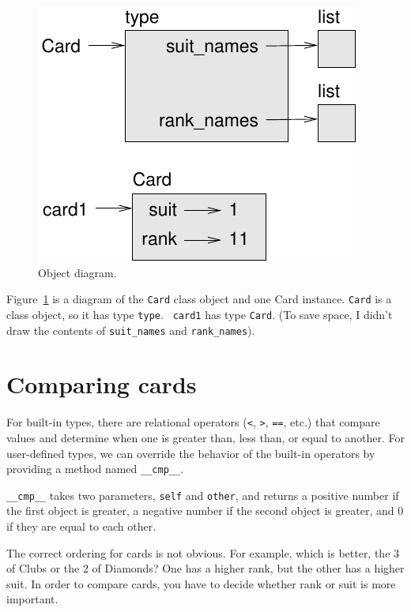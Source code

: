 \documentclass[10pt]{book}
\begin{document}
\begin{CJK}{UTF8}{gbsn}
\begin{figure}
\centerline
{\includegraphics[scale=0.8]{figs/card1.pdf}}
\caption{Object diagram.}
\label{fig.card1}
\end{figure}

Figure~\ref{fig.card1} is a diagram of the {\tt Card} class object
and one Card instance.
{\tt Card} is a class object, so it has type {\tt type}.  {\tt
card1} has type {\tt Card}.  (To save space, I didn't draw the
contents of \verb"suit_names" and \verb"rank_names").


\section{Comparing cards}
\label{comparecard}

For built-in types, there are relational operators
({\tt <}, {\tt >}, {\tt ==}, etc.)
that compare
values and determine when one is greater than, less than, or equal to
another.  For user-defined types, we can override the behavior of
the built-in operators by providing a method named
\verb"__cmp__".  

\verb"__cmp__" takes two parameters, {\tt self} and {\tt other},
and returns a positive number if the first object is greater, a
negative number if the second object is greater, and 0 if they are
equal to each other.

The correct ordering for cards is not obvious.
For example, which
is better, the 3 of Clubs or the 2 of Diamonds?  One has a higher
rank, but the other has a higher suit.  In order to compare
cards, you have to decide whether rank or suit is more important.


\end{CJK}
\end{document}
